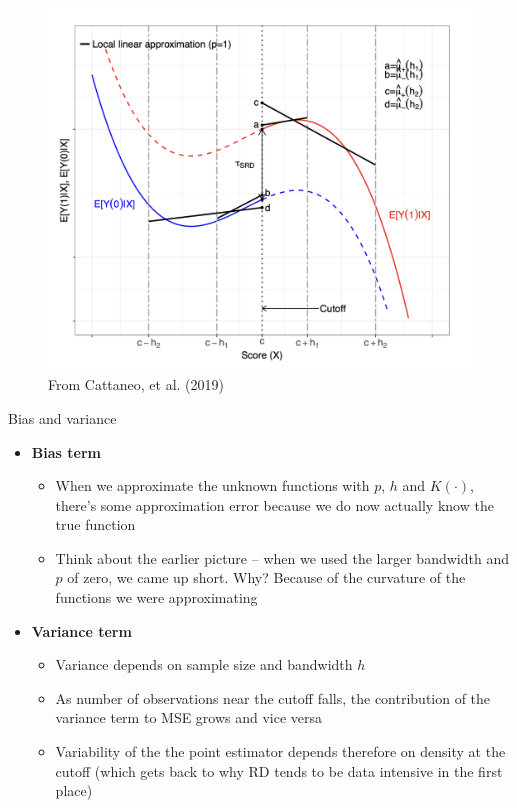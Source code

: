 \documentclass{beamer}
\begin{document}
\begin{frame}

		\begin{figure}
		\includegraphics[scale=0.27]{./lecture_includes/cattaneo_bandwidth}
		\caption{From Cattaneo, et al. (2019)}
		\end{figure}

\end{frame}




\begin{frame}{Bias and variance}

\begin{itemize}
\item \textbf{Bias term}
	\begin{itemize}
	\item When we approximate the unknown functions with $p$, $h$ and $K(\cdot)$, there's some approximation error because we do now actually know the true function
	\item Think about the earlier picture -- when we used the larger bandwidth and $p$ of zero, we came up short. Why? Because of the curvature of the functions we were approximating
	\end{itemize}
\item \textbf{Variance term}
	\begin{itemize}
	\item Variance depends on sample size and bandwidth $h$
	\item As number of observations near the cutoff falls, the contribution of the variance term to MSE grows and vice versa
	\item Variability of the the point estimator depends therefore on density at the cutoff (which gets back to why RD tends to be data intensive in the first place)
	\end{itemize}
\end{itemize}

\end{frame}
\end{document}
